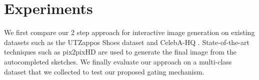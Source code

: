 \vspace{-4mm}
\section{Experiments}
\label{sec:experiments}
We first compare our 2 step approach for interactive image generation on existing datasets such as the UTZappos Shoes dataset \cite{yu2014fine} and CelebA-HQ \cite{karras2017progressive}. State-of-the-art techniques such as pix2pixHD \cite{Wang_2018_CVPR} are used to generate the final image from the autocompleted sketches. We finally evaluate our approach on a multi-class dataset that we collected to test our proposed gating mechanism.


